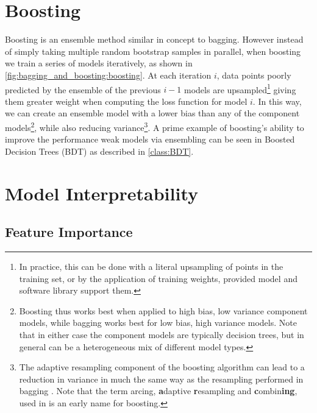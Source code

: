 \section{Boosting}
\label{ml_general:boosting}

Boosting \cite{10.5555/3091696.3091715,FREUND1997119,Breiman1996BiasV,friedman2000}
is an ensemble method similar in concept to bagging.
However instead of simply taking multiple random bootstrap samples in parallel,
when boosting we train a series of models iteratively,
as shown in \cref{fig:bagging_and_boosting:boosting}.
At each iteration $i$, data points poorly predicted
by the ensemble of the previous $i-1$ models are upsampled\footnote{In practice,
this can be done with a literal upsampling of points in the training set,
or by the application of training weights,
provided model and software library support them.} giving them
greater weight when computing the loss function for model $i$.
In this way, we can create an ensemble model with a lower bias than any of
the component models\footnote{Boosting thus works best when applied to high bias, low variance component models,
while bagging works best for low bias, high variance models.
Note that in either case the component models are typically decision trees,
but in general can be a heterogeneous mix of different model types.},
while also reducing variance\footnote{The adaptive resampling component of the boosting algorithm
can lead to a reduction in variance in much the same way as the resampling performed in bagging \cite{Breiman1996BiasV}.
Note that the term arcing, \ie \textbf{a}daptive \textbf{r}esampling and \textbf{c}ombin\textbf{ing}, used in \cite{Breiman1996BiasV}
is an early name for boosting.}.
A prime example of boosting's ability to improve the performance weak models via ensembling
can be seen in Boosted Decision Trees (BDT) as described in \cref{class:BDT}.

\section{Model Interpretability}
\label{ml_general:interp}

\subsection{Feature Importance}
\label{ml_general:interp:feature_importance}

